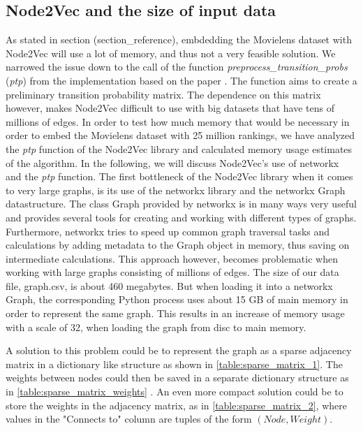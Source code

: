\subsection{Node2Vec and the size of input data}\label{AP:N2V}
As stated in section (section\_reference), embdedding the Movielens dataset with Node2Vec will use a lot of memory, and thus not a very feasible solution. We narrowed the issue down to the call of the function  \textit{preprocess\_transition\_probs} (\textit{ptp}) from the implementation based on the paper \cite{Node2vec}. The function aims to create a preliminary transition probability matrix. The dependence on this matrix however, makes Node2Vec difficult to use with big datasets that have tens of millions of edges. In order to test how much memory that would be necessary in order to embed the Movielens dataset with 25 million rankings, we have analyzed the \textit{ptp} function of the Node2Vec library and calculated memory usage estimates of the algorithm. In the following, we will discuss Node2Vec's use of networkx and the \textit{ptp} function.
The first bottleneck of the Node2Vec library when it comes to very large graphs, is its use of the networkx library and the networkx Graph datastructure.
The class Graph provided by networkx is in many ways very useful and provides several tools for creating and working with different types of graphs. Furthermore, networkx tries to speed up common graph traversal tasks and calculations by adding metadata to the Graph object in memory, thus saving on intermediate calculations.
This approach however, becomes problematic when working with large graphs consisting of millions of edges. The size of our data file, graph.csv, is about 460 megabytes. But when loading it into a networkx Graph, the corresponding Python process uses about 15 GB of main memory in order to represent the same graph. This results in an increase of memory usage with a scale of 32, when loading the graph from disc to main memory.

A solution to this problem could be to represent the graph as a sparse adjacency matrix  in a dictionary like structure as shown in \autoref{table:sparse_matrix_1}. The weights between nodes could then be saved in a separate dictionary structure as in \autoref{table:sparse_matrix_weights} . An even more compact solution could be to store the weights in the adjacency matrix, as in \autoref{table:sparse_matrix_2}, where values in the "Connects to" column are tuples of the form $(Node, Weight)$.

